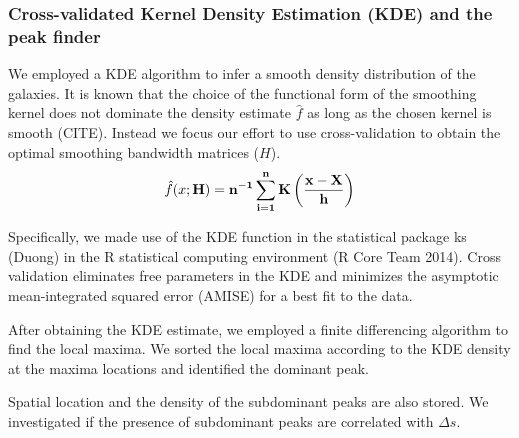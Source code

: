 \documentclass[usenatbib]{mn2e}
\begin{document}
\subsubsection{Cross-validated Kernel Density Estimation (KDE) and the peak finder} 
We employed a KDE algorithm to infer a smooth density distribution of the
galaxies.
It is known that the choice of the functional form of the smoothing kernel does
not dominate the density estimate $\hat{f}$ as long as the chosen kernel is smooth (CITE).
Instead we focus our effort to use cross-validation to obtain the optimal smoothing
bandwidth matrices ($H$). 
\begin{equation}
	\hat{f}(x; \bf{H}) = n^{-1} \sum_{i=1}^n K\left(\frac{x-X}{h}\right)
\end{equation}

Specifically, we made use of the KDE function in
the statistical package ks (Duong) in the R statistical computing environment (R Core Team 2014).
Cross validation eliminates free parameters in the KDE and minimizes
the asymptotic mean-integrated squared error (AMISE) for a best fit to the
data.

After obtaining the KDE estimate, we employed a finite differencing algorithm
to find the local maxima. We sorted the local maxima according to the KDE
density at the maxima locations and identified the dominant peak. 

Spatial location and the density of the subdominant peaks are also stored.
We investigated if the presence of subdominant peaks are correlated with
$\Delta s$. 
\end{document}

